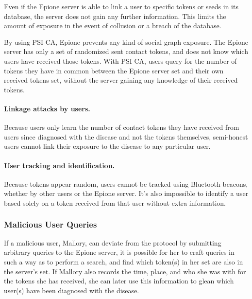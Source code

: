 \documentclass[11pt]{article} %
\newcommand{\dect}{\textsf{Epione}\xspace}
\newcommand{\psica}{PSI-CA\xspace}
\begin{document}
{	Even if the \dect server is able to link a user to specific tokens or seeds in its database, the server does not gain any further information. This limits the amount of exposure in the event of collusion or a breach of the database.
	
	By using \psica, \dect prevents any kind of social graph exposure. The \dect server has only a set of randomized sent contact tokens, and does not know which users have received those tokens. With \psica, users query for the number of tokens they have in common between the \dect server set and their own received tokens set, without the server gaining any knowledge of their received tokens.
	
	\paragraph{Linkage attacks by users.} Because users only learn the number of contact tokens they have received from users since diagnosed with the disease and not the tokens themselves, semi-honest users cannot link their exposure to the disease to any particular user.
	
	\paragraph{User tracking and identification.} Because tokens appear random, users cannot be tracked using Bluetooth beacons, whether by other users or the \dect server. It's also impossible to identify a user based solely on a token received from that user without extra information.
	
	\subsubsection{Malicious User Queries}
	
	If a malicious user, Mallory, can deviate from the protocol by submitting arbitrary queries to the \dect server, it is possible for her to craft queries in such a way as to perform a search, and find which token(s) in her set are also in the server's set. If Mallory also records the time, place, and who she was with for the tokens she has received, she can later use this information to glean which user(s) have been diagnosed with the disease.
	
}
\end{document}
